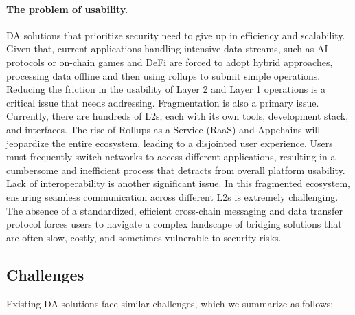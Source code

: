 \documentclass[11pt]{article}
\begin{document}
\paragraph{The problem of usability.} DA solutions that prioritize security need to give up in efficiency and scalability. Given that, current applications handling intensive data streams, such as AI protocols or on-chain games and DeFi are forced to adopt hybrid approaches, processing data offline and then using rollups to submit simple operations. Reducing the friction in the usability of Layer 2 and Layer 1 operations is a critical issue that needs addressing.
%
Fragmentation is also a primary issue. Currently, there are hundreds of L2s, each with its own tools, development stack, and interfaces. The rise of Rollups-as-a-Service (RaaS) and Appchains will jeopardize the entire ecosystem, leading to a disjointed user experience. Users must frequently switch networks to access different applications, resulting in a cumbersome and inefficient process that detracts from overall platform usability.
%
Lack of interoperability is another significant issue. In this fragmented ecosystem, ensuring seamless communication across different L2s is extremely challenging. The absence of a standardized, efficient cross-chain messaging and data transfer protocol forces users to navigate a complex landscape of bridging solutions that are often slow, costly, and sometimes vulnerable to security risks.

\subsection{Challenges}
Existing DA solutions face similar challenges, which we summarize as follows:
\end{document}
